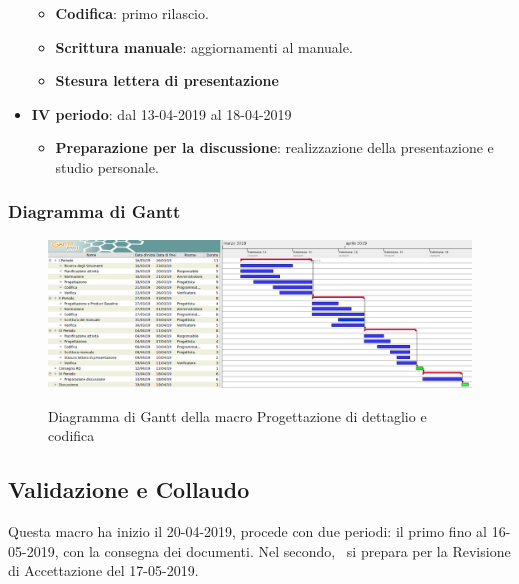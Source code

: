 \begin{itemize}
\begin{itemize}
    	        \item \textbf{Codifica}: primo rilascio.
    	        \item \textbf{Scrittura manuale}: aggiornamenti al manuale.
    	        \item \textbf{Stesura lettera di presentazione}
        	\end{itemize}
        	\item \textbf{IV periodo}: dal 13-04-2019 al 18-04-2019
			\begin{itemize}
				\item \textbf{Preparazione per la discussione}: realizzazione della presentazione e studio personale.
        	\end{itemize}
        \end{itemize}

        \begin{landscape}
			\subsubsection{Diagramma di Gantt}        
			\begin{figure}[H]
					\centering
					\includegraphics[scale=0.44]{img/Progettazione_di_dettaglio_e_codifica.png}\\
					\caption{Diagramma di Gantt della macro Progettazione di dettaglio e codifica}
			\end{figure}
		\end{landscape}
		\newpage

        \subsection{Validazione e Collaudo}
        Questa macro ha inizio il 20-04-2019, procede con due periodi: il primo fino al 16-05-2019, con la consegna dei documenti. Nel secondo, \gruppo\ si
        prepara per la Revisione di Accettazione del 17-05-2019.

